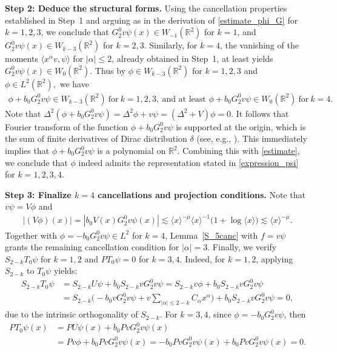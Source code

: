 \documentclass[reqno]{amsart}
\numberwithin{equation}{section}
\begin{document}
\textbf{Step 2:  Deduce the structural forms.}
Using the cancellation properties established in Step~1 and arguing as in the derivation of \eqref{estimate_phi_G} for ${k}=1,2,3$, we conclude that $G_2^0 v\psi(x) \in W_{-1}(\mathbb{R}^2)$ for ${k}=1$, and $G_2^0 v\psi(x) \in W_{{k}-3}(\mathbb{R}^2)$ for ${k}=2,3$. Similarly, for ${k}=4$, the vanishing of the moments $\langle x^{\alpha}v, \psi\rangle$ for $|\alpha| \le 2$, already obtained in Step~1, at least yields $G_2^0 v\psi(x) \in W_{0}(\mathbb{R}^2)$.
Thus by  $\phi \in W_{{k}-3}(\mathbb{R}^2)$ for ${k}=1,2,3$  and $\phi\in L^2(\mathbb{R}^2),$
we have
\begin{equation}\label{estimate}
	\begin{split}
		\phi+b_0 G_2^0 v \psi \in
		W_{{k}-3}(\mathbb{R}^2)\ \text{for} \ {k}=1,2,3, \ \text{and at least } 	\phi+b_0 G_2^0 v \psi \in
		W_{0}(\mathbb{R}^2) \ \text{for} \ {k}=4.
	\end{split}
\end{equation}
Note that
$
	\Delta^2\left(\phi+b_0 G_2^0 v \psi\right) =\Delta^2 \phi+ v \psi=\left(\Delta^2+V\right) \phi=0.
$
It follows that Fourier transform of the function $\phi+b_0 G_2^0 v \psi $ is supported
at the origin, which is the sum of finite derivatives of Dirac distribution $\delta$ (see, e.g., \cite{GG21b}).
This immediately implies that $\phi+b_0 G_2^0 v \psi $ is a polynomial on $\mathbb{R}^2$.
Combining this with  \eqref{estimate}, we conclude that $\phi$ indeed admits the representation stated in \eqref{expression_psi} for ${k}=1,2,3,4$.


\textbf{Step 3: Finalize ${k}=4$ cancellations and projection conditions.}
Note that $v\psi=V\phi$ and
\begin{align*}
	|(V\phi)(x)|=|b_0V(x) G_2^0 v\psi(x)|\lesssim\langle x \rangle^{-\mu}\langle x \rangle^{-1} \big( 1 + \log \langle x \rangle \big)\lesssim\langle x \rangle^{-\mu}.
\end{align*}
Together with $\phi=-b_0G_2^0 v \psi \in L^2$ for ${k} = 4$, Lemma~\ref{S_5canc} with $f = v \psi$  grants the remaining cancellation condition for $|\alpha|=3$.
Finally, we verify $S_{2-{k}}T_0\psi$ for ${k}=1,2$ and $PT_0\psi=0$ for ${k}=3,4.$ Indeed,
for ${k}=1,2$, applying $S_{2-{k}}$ to $T_0\psi$ yields:
\begin{align*}
	S_{2-{k}}T_0\psi &= S_{2-k}U\psi + b_0 S_{2-{k}}v G_2^0 v\psi = S_{2-{k}}v\phi + b_0 S_{2-{k}}v G_2^0 v\psi \\
	&= S_{2-{k}}\Big( -b_0 vG_2^0 v\psi + v\sum_{|\alpha| \le 2 - {k}} C_\alpha x^\alpha \Big) + b_0 S_{2-{k}}v G_2^0 v\psi = 0,
\end{align*}
due to the intrinsic orthogonality of $S_{2-{k}}$. For ${k}=3,4$, since  $\phi = -b_0 G_2^0 v \psi$, then
\begin{align*}
	PT_0\psi(x)&=PU\psi(x)+b_0PvG_2^0 v\psi(x)\\
	&=Pv\phi+b_0PvG_2^0 v\psi(x)=-b_0PvG_2^0 v\psi(x)+b_0PvG_2^0 v\psi(x)=0. 
\end{align*}
\end{document}
